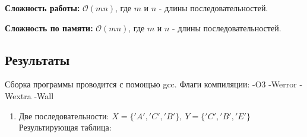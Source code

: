 \documentclass[12pt]{article}
\begin{document}
\textbf{Сложность работы:} $\mathcal{O}(mn)$, где $m$ и $n$ - длины последовательностей.

\textbf{Сложноcть по памяти:} $\mathcal{O}(mn)$, где $m$ и $n$ - длины последовательностей.

\newpage
\subsection{Результаты}

    Сборка программы проводится с помощью gcc.
    Флаги компиляции: -O3 -Werror - Wextra -Wall

\begin{enumerate}
    \item Две последовательности: $X= \{'A', 'C', 'B'\},\ Y= \{'C', 'B', 'E'\}$ \\
        Результирующая таблица:



\end{enumerate}
\end{document}
